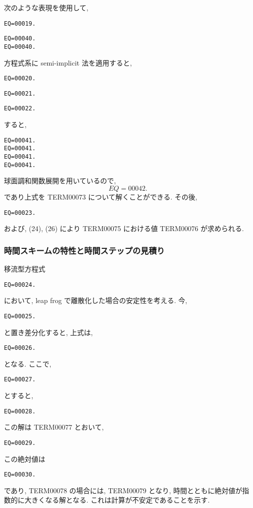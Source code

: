 次のような表現を使用して,
%
\begin{verbatim}
EQ=00019.
\end{verbatim}
%
\begin{verbatim}
EQ=00040.
EQ=00040.
\end{verbatim}
%
方程式系に semi-implicit 法を適用すると,
%
\begin{verbatim}
EQ=00020.
\end{verbatim}
%
\begin{verbatim}
EQ=00021.
\end{verbatim}
%
\begin{verbatim}
EQ=00022.
\end{verbatim}


すると, 
%
\begin{verbatim}
EQ=00041.
EQ=00041.
EQ=00041.
EQ=00041.
\end{verbatim}

球面調和関数展開を用いているので,
\[
EQ=00042.
\]
であり上式を TERM00073 について解くことができる.
%
その後,
%
\begin{verbatim}
EQ=00023.
\end{verbatim}
%
および, (24), (26)
により TERM00075 における値 TERM00076
が求められる.

\subsubsection{時間スキームの特性と時間ステップの見積り}

移流型方程式 
\begin{verbatim}
EQ=00024.
\end{verbatim}
において,  leap frog で離散化した場合の安定性を考える.
今, 
\begin{verbatim}
EQ=00025.
\end{verbatim}
と置き差分化すると, 上式は,
\begin{verbatim}
EQ=00026.
\end{verbatim}
となる.
ここで,
\begin{verbatim}
EQ=00027.
\end{verbatim}
とすると,
\begin{verbatim}
EQ=00028.
\end{verbatim}
この解は TERM00077 とおいて,
\begin{verbatim}
EQ=00029.
\end{verbatim}

この絶対値は
\begin{verbatim}
EQ=00030.
\end{verbatim}
であり, TERM00078 の場合には, TERM00079 となり,
時間とともに絶対値が指数的に大きくなる解となる.
これは計算が不安定であることを示す.

